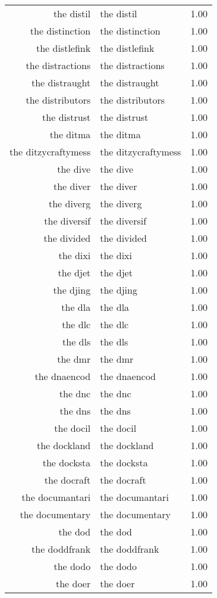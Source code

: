 \begin{table}[ht]
\begin{tabular}{rlr}
  the distil & the distil & 1.00 \\ 
  the distinction & the distinction & 1.00 \\ 
  the distlefink & the distlefink & 1.00 \\ 
  the distractions & the distractions & 1.00 \\ 
  the distraught & the distraught & 1.00 \\ 
  the distributors & the distributors & 1.00 \\ 
  the distrust & the distrust & 1.00 \\ 
  the ditma & the ditma & 1.00 \\ 
  the ditzycraftymess & the ditzycraftymess & 1.00 \\ 
  the dive & the dive & 1.00 \\ 
  the diver & the diver & 1.00 \\ 
  the diverg & the diverg & 1.00 \\ 
  the diversif & the diversif & 1.00 \\ 
  the divided & the divided & 1.00 \\ 
  the dixi & the dixi & 1.00 \\ 
  the djet & the djet & 1.00 \\ 
  the djing & the djing & 1.00 \\ 
  the dla & the dla & 1.00 \\ 
  the dlc & the dlc & 1.00 \\ 
  the dls & the dls & 1.00 \\ 
  the dmr & the dmr & 1.00 \\ 
  the dnaencod & the dnaencod & 1.00 \\ 
  the dnc & the dnc & 1.00 \\ 
  the dns & the dns & 1.00 \\ 
  the docil & the docil & 1.00 \\ 
  the dockland & the dockland & 1.00 \\ 
  the docksta & the docksta & 1.00 \\ 
  the docraft & the docraft & 1.00 \\ 
  the documantari & the documantari & 1.00 \\ 
  the documentary & the documentary & 1.00 \\ 
  the dod & the dod & 1.00 \\ 
  the doddfrank & the doddfrank & 1.00 \\ 
  the dodo & the dodo & 1.00 \\ 
  the doer & the doer & 1.00 \\ 

\end{tabular}
\end{table}
